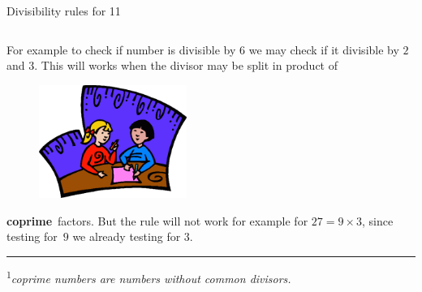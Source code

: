 \documentclass[9pt,aspectratio=169]{beamer}
\begin{document}
\begin{frame}{Divisibility rules for 11}
\begin{columns}[T]
\begin{column}{0.5\textwidth}
      For example to check if number is divisible by $6$ we may check if it divisible by $2$ and $3$. This will works when the divisor may be split in product of 
      \begin{figure}
        \vspace*{-0.8em}
        \includegraphics[width=0.43\textwidth]{01 - Modular arithmetic/collab.png}
      \end{figure}
      \textbf{coprime}\footnotemark\ factors. 
      But the rule will not work for example for $27 = 9 \times 3$, since testing for~$9$ we already testing for $3$.
      \vspace*{2.5em}
      \hrule
      \vspace*{2pt}
      {\footnotesize \textsuperscript{1}\emph{coprime numbers are numbers without common divisors.}}
    \end{column}
  \end{columns}
\end{frame}
\end{document}
